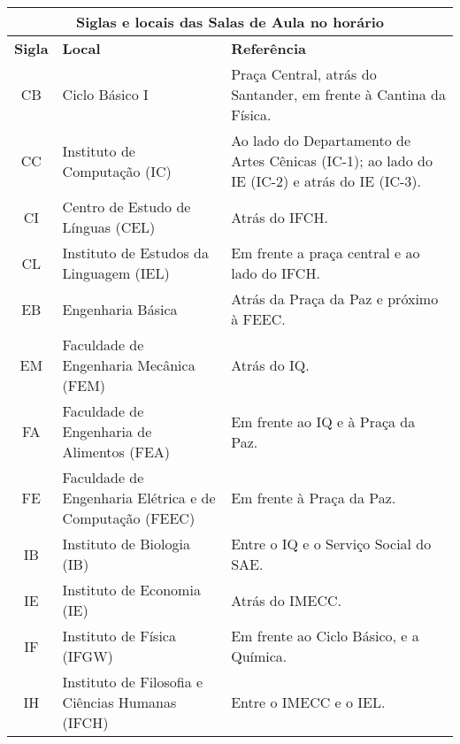 \begin{table*}[ht!]
\centering
\begin{tabular}{|c|p{}|p{}|}\hline
    \multicolumn{3}{|c|}{ \textbf{Siglas e locais das Salas de Aula no
    horário}}\\ \hline

    \textbf{Sigla}  &  \textbf{Local}  &  \textbf{Referência}\\ \hline

    CB  &  Ciclo Básico I  &  Praça Central, atrás do Santander, em frente à
    Cantina da Física.\\ \hline

    CC  &  Instituto de Computação (IC)  &  Ao lado do Departamento de Artes
    Cênicas (IC-1); ao lado do IE (IC-2) e atrás do IE (IC-3).\\ \hline

    CI  &  Centro de Estudo de Línguas (CEL)  &  Atrás do IFCH.\\ \hline

    CL  &  Instituto de Estudos da Linguagem (IEL)  &  Em frente a praça
    central e ao lado do IFCH.\\ \hline

    EB  &  Engenharia Básica  &  Atrás da Praça da Paz e próximo à FEEC.\\
    \hline

    EM  &  Faculdade de Engenharia Mecânica (FEM)  &  Atrás do IQ.\\ \hline

    FA  &  Faculdade de Engenharia de Alimentos (FEA)  &  Em frente ao IQ e à
    Praça da Paz.\\ \hline

    FE  &  Faculdade de Engenharia Elétrica e de Computação (FEEC)  &  Em
    frente à Praça da Paz.\\ \hline

    IB  &  Instituto de Biologia (IB)  &  Entre o IQ e o Serviço Social do
    SAE.\\ \hline

    IE  &  Instituto de Economia (IE)  &  Atrás do IMECC.\\ \hline

    IF  &  Instituto de Física (IFGW)  &  Em frente ao Ciclo Básico, e a
    Química.\\ \hline

    IH  &  Instituto de Filosofia e Ciências Humanas (IFCH)  &  Entre o IMECC e
    o IEL.\\ \hline


\end{tabular}
\end{table*}
